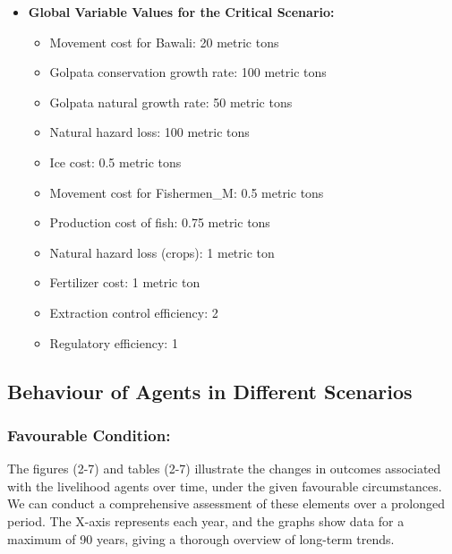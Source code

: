 \documentclass[final,5p,times,twocolumn,authoryear]{elsarticle}
\begin{document}
\begin{itemize}
    \item \textbf{Global Variable Values for the Critical Scenario:}
    \begin{itemize}
        \item Movement cost for Bawali: 20 metric tons
        \item Golpata conservation growth rate: 100 metric tons
        \item Golpata natural growth rate: 50 metric tons
        \item Natural hazard loss: 100 metric tons
        \item Ice cost: 0.5 metric tons
        \item Movement cost for Fishermen\_M: 0.5 metric tons
        \item Production cost of fish: 0.75 metric tons
        \item Natural hazard loss (crops): 1 metric ton
        \item Fertilizer cost: 1 metric ton
        \item Extraction control efficiency: 2
        \item Regulatory efficiency: 1
    \end{itemize}
\end{itemize}
\subsection{Behaviour of Agents in Different Scenarios}
\subsubsection{Favourable Condition:}
The figures (2-7) and tables (2-7) illustrate the changes in outcomes associated with the livelihood agents over time, under the given favourable circumstances. We can conduct a comprehensive assessment of these elements over a prolonged period. The X-axis represents each year, and the graphs show data for a maximum of 90 years, giving a thorough overview of long-term trends.
\end{document}
